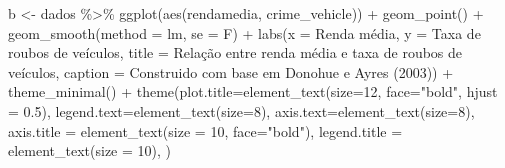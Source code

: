 \documentclass[
]{article}
\newenvironment{Shaded}{\begin{snugshade}}{\end{snugshade}}
\newcommand{\AttributeTok}[1]{\textcolor[rgb]{0.77,0.63,0.00}{#1}}
\newcommand{\DecValTok}[1]{\textcolor[rgb]{0.00,0.00,0.81}{#1}}
\newcommand{\FloatTok}[1]{\textcolor[rgb]{0.00,0.00,0.81}{#1}}
\newcommand{\FunctionTok}[1]{\textcolor[rgb]{0.00,0.00,0.00}{#1}}
\newcommand{\NormalTok}[1]{#1}
\newcommand{\OtherTok}[1]{\textcolor[rgb]{0.56,0.35,0.01}{#1}}
\newcommand{\SpecialCharTok}[1]{\textcolor[rgb]{0.00,0.00,0.00}{#1}}
\newcommand{\StringTok}[1]{\textcolor[rgb]{0.31,0.60,0.02}{#1}}
\begin{document}
\begin{Shaded}
\begin{Highlighting}[]
\NormalTok{b }\OtherTok{\textless{}{-}}\NormalTok{ dados }\SpecialCharTok{\%\textgreater{}\%} 
  \FunctionTok{ggplot}\NormalTok{(}\FunctionTok{aes}\NormalTok{(rendamedia, crime\_vehicle)) }\SpecialCharTok{+}
  \FunctionTok{geom\_point}\NormalTok{() }\SpecialCharTok{+} 
  \FunctionTok{geom\_smooth}\NormalTok{(}\AttributeTok{method =} \StringTok{\textquotesingle{}lm\textquotesingle{}}\NormalTok{, }\AttributeTok{se =}\NormalTok{ F) }\SpecialCharTok{+}
  \FunctionTok{labs}\NormalTok{(}\AttributeTok{x =} \StringTok{\textquotesingle{}Renda média\textquotesingle{}}\NormalTok{,}
       \AttributeTok{y =} \StringTok{\textquotesingle{}Taxa de roubos de veículos\textquotesingle{}}\NormalTok{,}
       \AttributeTok{title =} \StringTok{\textquotesingle{}Relação entre renda média e taxa de roubos de veículos\textquotesingle{}}\NormalTok{,}
       \AttributeTok{caption =} \StringTok{\textquotesingle{}Construido com base em Donohue e Ayres (2003)\textquotesingle{}}\NormalTok{) }\SpecialCharTok{+} 
  \FunctionTok{theme\_minimal}\NormalTok{() }\SpecialCharTok{+}
  \FunctionTok{theme}\NormalTok{(}\AttributeTok{plot.title=}\FunctionTok{element\_text}\NormalTok{(}\AttributeTok{size=}\DecValTok{12}\NormalTok{, }\AttributeTok{face=}\StringTok{"bold"}\NormalTok{, }\AttributeTok{hjust =} \FloatTok{0.5}\NormalTok{),}
        \AttributeTok{legend.text=}\FunctionTok{element\_text}\NormalTok{(}\AttributeTok{size=}\DecValTok{8}\NormalTok{),}
        \AttributeTok{axis.text=}\FunctionTok{element\_text}\NormalTok{(}\AttributeTok{size=}\DecValTok{8}\NormalTok{),}
        \AttributeTok{axis.title =} \FunctionTok{element\_text}\NormalTok{(}\AttributeTok{size =} \DecValTok{10}\NormalTok{, }\AttributeTok{face=}\StringTok{"bold"}\NormalTok{),}
        \AttributeTok{legend.title =} \FunctionTok{element\_text}\NormalTok{(}\AttributeTok{size =} \DecValTok{10}\NormalTok{),}
\NormalTok{        )}
  

\end{Highlighting}
\end{Shaded}
\end{document}
